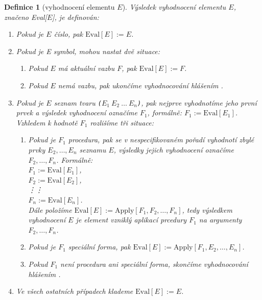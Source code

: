 \documentclass[10pt,a4paper]{article}
\newtheorem{definition}{Definice}
\begin{document}
    \begin{definition}[vyhodnocení elementu $E$]
      \textit{Výsledek vyhodnocení elementu} $E$, značeno Eval[$E$], je definován:
      \begin{enumerate}
        \item Pokud je $E$ \textit{číslo}, pak $\text{Eval}[E]:=E$.
        \item Pokud je E \textit{symbol}, mohou nastat dvě situace:
          \begin{enumerate}
            \item Pokud $E$ \textit{má aktuální vazbu} $F$, pak $\text{Eval}[E]:=F$.
            \item Pokud $E$ \textit{nemá vazbu}, pak ukončíme vyhodnocování hlášením .
          \end{enumerate}
        \item Pokud je $E$ \textit{seznam} tvaru \texttt{($E_{1}\ E_{2}\ \ldots\ E_{n}$)}, pak nejprve vyhodnotíme jeho první prvek a výsledek vyhodnocení označíme $F_{1}$, formálně: $F_{1}:=\text{Eval}[E_{1}]$. Vzhledem k hodnotě $F_{1}$ rozlišíme tři situace:
          \begin{enumerate}
            \item Pokud je $F_{1}$ procedura, pak se v nespecifikovaném pořadí vyhodnotí zbylé prvky $E_2,\ldots,E_n$ seznamu $E$, výsledky jejich vyhodnocení označíme $F_2,\ldots,F_n$. Formálně:\\
              $F_1:=\text{Eval}[E_1]$,\\
              $F_2:=\text{Eval}[E_2]$,\\
              \vdots\quad\quad\quad\vdots \\
              $F_n:=\text{Eval}[E_n]$.\\
              Dále položíme $\text{Eval}[E]:=\text{Apply}[F_1,F_2,\ldots,F_n]$, tedy výsledkem vyhodnocení $E$ je element vzniklý \textit{aplikací prcedury $F_1$ na argumenty $F_2,\ldots,F_n$}.
            \item Pokud je $F_1$ \textit{speciální forma}, pak $\text{Eval}[E]:=\text{Apply}[F_1,E_2,\ldots,E_n]$.
            \item Pokud $F_1$ není \textit{procedura ani speciální forma}, skončíme vyhodnocování hlášením .
          \end{enumerate}
        \item Ve všech ostatních případech klademe $\text{Eval}[E]:=E$.
      \end{enumerate}
    \end{definition}
\end{document}
